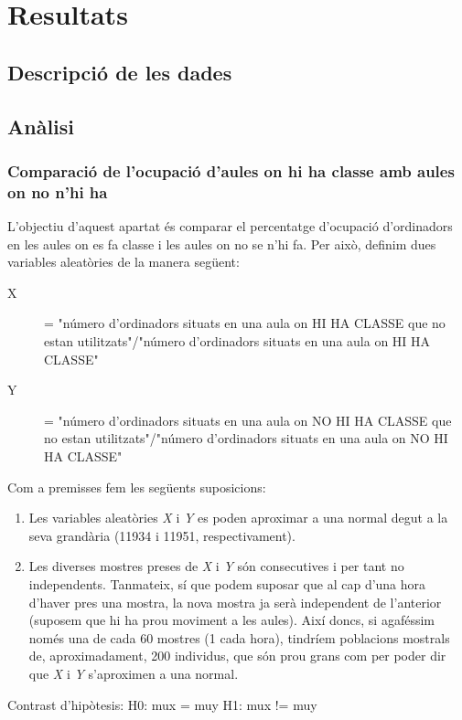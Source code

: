 \section{Resultats}

\subsection{Descripció de les dades}


\subsection{Anàlisi}
\subsubsection{Comparació de l'ocupació d'aules on hi ha classe amb aules on no n'hi ha}
L'objectiu d'aquest apartat és comparar el percentatge d'ocupació d'ordinadors en les aules on es fa classe i les aules on no se n'hi fa. Per això, definim dues variables aleatòries de la manera següent:
\begin{description}
\item[X] = "número d'ordinadors situats en una aula on HI HA CLASSE que no estan utilitzats"/"número d'ordinadors situats en una aula on HI HA CLASSE"
\item[Y] = "número d'ordinadors situats en una aula on NO HI HA CLASSE que no estan utilitzats"/"número d'ordinadors situats en una aula on NO HI HA CLASSE"
\end{description}

Com a premisses fem les següents suposicions:
\begin{enumerate}
	\item Les variables aleatòries \emph{X} i \emph{Y} es poden aproximar a una normal degut a la seva grandària (11934 i 11951, respectivament).
	\item Les diverses mostres preses de \emph{X} i \emph{Y} són consecutives i per tant no independents. Tanmateix, sí que podem suposar que al cap d'una hora d'haver pres una mostra, la nova mostra ja serà independent de l'anterior (suposem que hi ha prou moviment a les aules). Així doncs, si agaféssim només una de cada 60 mostres (1 cada hora), tindríem poblacions mostrals de, aproximadament, 200 individus, que són prou grans com per poder dir que \emph{X} i \emph{Y} s'aproximen a una normal.
\end{enumerate}

Contrast d'hipòtesis:
H0: mux = muy
H1: mux != muy

